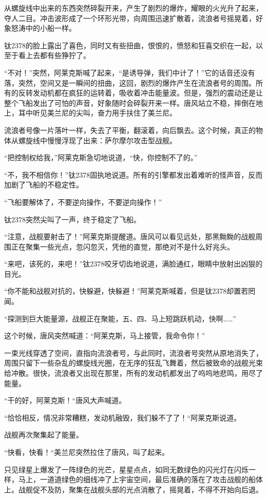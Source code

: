 从螺旋线中出来的东西突然碎裂开来，产生了剧烈的爆炸，耀眼的火光升了起来，夺人二目。冲击波形成了一个环形光带，向周围迅速扩散着，流浪者号摇晃着，好象怒涛中的小船一样。 

钛2378的脸上露出了喜色，同时又有些扭曲，恨恨的，愤怒和狂喜交织在一起，以至于看上去都有些狰狞了。 

“不对！”突然，阿莱克斯喊了起来，“是诱导弹，我们中计了！”它的话音还没有落，突然，空间又是一瞬间的扭曲，这回，剧烈的爆炸产生在流浪者号的周围。所有的反转发动机都在疯狂的运转着，吸收着冲击能量波。但是，强烈的震动还是让整个飞船发出了可怕的声音，好象随时会碎裂开来一样。唐风站立不稳，摔倒在地上，耳中听见美兰尼的尖叫，奋力用手扶住了美兰尼。 

流浪者号像一片落叶一样，失去了平衡，翻滚着，向后飘去。这个时候，真正的物体从螺旋线中慢慢浮现了出来：萨尔摩尔攻击型战舰。 

“把控制权给我，”阿莱克斯急切地说道，“快，你控制不了的。” 

“不，我不相信你！”钛2378固执地说道。所有的引擎都发出着难听的怪声音，反而加剧了飞船的不稳定性。 

“飞船要解体了，不要逆向操作，不要逆向操作！” 

钛2378突然尖叫了一声，终于稳定了飞船。 

“注意，战舰要射击了！”阿莱克斯提醒道。唐风可以看见远处，那黑黝黝的战舰周围正在聚集一些光点，忽闪忽灭，凭他的直觉，那绝对不是什么好兆头。 

“来吧，该死的，来吧！”钛2378咬牙切齿地说道，满脸通红，眼睛中放射出凶狠的目光。 

“你不能和战舰对抗的，快躲避，快躲避！”阿莱克斯喊着，但是钛2378却置若罔闻。 

“探测到巨大能量源，战舰正在聚能，五、四、马上短跳跃机动，快啊……” 

这个时候，唐风突然喊道：“阿莱克斯，马上接管，我命令你！” 

一束光线穿透了空间，直指向流浪者号，与此同时，流浪者号突然从原地消失了，周围只留下一些杂乱的螺旋线光圈，在无序的狂乱飞舞着，然后被致命的战舰光束给冲散。很快，流浪者又出现在那里，所有的发动机都发出了呜呜地悲鸣，用尽了能量。 

“干的好，阿莱克斯！“唐风大声喊道。 

“恰恰相反，情况非常糟糕，发动机融毁，我们躲不了了！“阿莱克斯说道。 

战舰再次聚集起了能量。 

“快看，快看！“美兰尼突然拉住了唐风，叫了起来。 

只见绿星上爆发了一阵绿色的光芒，星星点点，如同无数绿色的闪光灯在闪烁一样，马上，一道道绿色的细线冲了上宇宙空间，最后准确的落在了攻击战舰的船体上。战舰促不及防，聚集在战舰头部的光点消散了，摇晃着，不得不开始向后退。 

